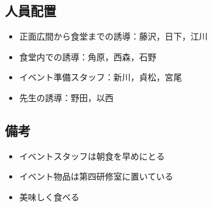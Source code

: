 \subsection{人員配置}
\begin{itemize}
\item 正面広間から食堂までの誘導：藤沢，日下，江川
\item 食堂内での誘導：角原，西森，石野
\item イベント準備スタッフ：新川，貞松，宮尾
  \item 先生の誘導：野田，以西
\end{itemize}



\subsection{備考}
\begin{itemize}
\item イベントスタッフは朝食を早めにとる
\item イベント物品は第四研修室に置いている
\item 美味しく食べる


\end{itemize}

%

